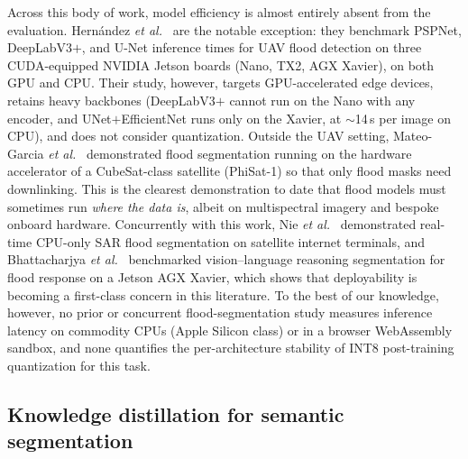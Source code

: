 Across this body of work, model efficiency is almost entirely absent from the evaluation. Hern\'andez \emph{et al.}~\cite{hernandez2022flood} are the notable exception: they benchmark PSPNet, DeepLabV3$+$, and U-Net inference times for UAV flood detection on three CUDA-equipped NVIDIA Jetson boards (Nano, TX2, AGX Xavier), on both GPU and CPU. Their study, however, targets GPU-accelerated edge devices, retains heavy backbones (DeepLabV3$+$ cannot run on the Nano with any encoder, and UNet$+$EfficientNet runs only on the Xavier, at $\sim$14\,s per image on CPU), and does not consider quantization. Outside the UAV setting, Mateo-Garcia \emph{et al.}~\cite{mateogarcia2021onboard} demonstrated flood segmentation running on the hardware accelerator of a CubeSat-class satellite (PhiSat-1) so that only flood masks need downlinking. This is the clearest demonstration to date that flood models must sometimes run \emph{where the data is}, albeit on multispectral imagery and bespoke onboard hardware. Concurrently with this work, Nie \emph{et al.}~\cite{nie2026gated} demonstrated real-time CPU-only SAR flood segmentation on satellite internet terminals, and Bhattacharjya \emph{et al.}~\cite{bhattacharjya2026floodreasonbench} benchmarked vision--language reasoning segmentation for flood response on a Jetson AGX Xavier, which shows that deployability is becoming a first-class concern in this literature. To the best of our knowledge, however, no prior or concurrent flood-segmentation study measures inference latency on commodity CPUs (Apple Silicon class) or in a browser WebAssembly sandbox, and none quantifies the per-architecture stability of INT8 post-training quantization for this task.

\subsection{Knowledge distillation for semantic segmentation}
\label{sec:rw-kd}

